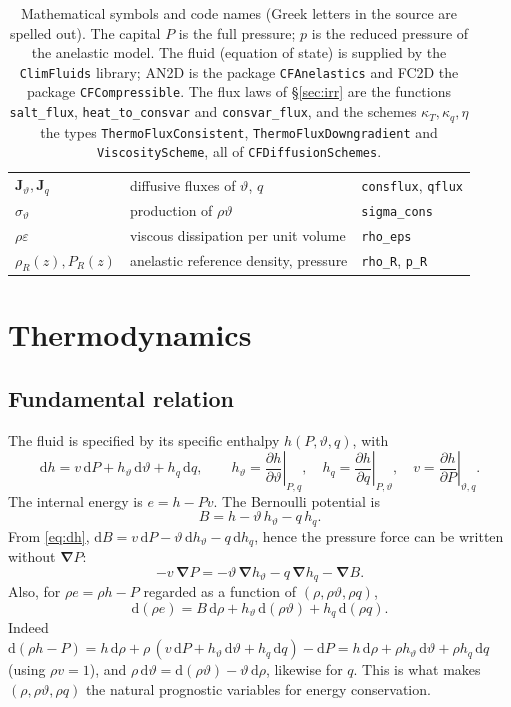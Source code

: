 \documentclass[11pt,a4paper]{article}
\newcommand{\vt}{\vartheta}                    %
\newcommand{\hth}{{h_{\vartheta}}}               %
\newcommand{\hq}{{h_q}}                          %
\newcommand{\bJ}{\mathbf{J}}
\newcommand{\bnabla}{\boldsymbol{\nabla}}
\newcommand{\pdc}[3]{\left.\frac{\partial #1}{\partial #2}\right|_{#3}}
\newcommand{\code}[1]{\texttt{#1}}
\begin{document}
\begin{table}[ht]
\begin{tabular}{p{4.3cm}p{6.0cm}p{4.9cm}}
$\bJ_\vt,\bJ_q$ & diffusive fluxes of $\vt$, $q$ & \code{consflux}, \code{qflux} \\
$\sigma_\vt$ & production of $\rho\vt$ & \code{sigma\_cons} \\
$\rho\varepsilon$ & viscous dissipation per unit volume & \code{rho\_eps} \\
$\rho_R(z),P_R(z)$ & anelastic reference density, pressure & \code{rho\_R}, \code{p\_R} \\
\hline
\end{tabular}
\caption{Mathematical symbols and code names (Greek letters in the source are spelled out). The capital $P$ is the full pressure; $p$ is the reduced pressure of the anelastic model.
The fluid (equation of state) is supplied by the \code{ClimFluids} library; AN2D is the package \code{CFAnelastics} and FC2D the package \code{CFCompressible}. The flux laws of \S\ref{sec:irr} are the functions \code{salt\_flux}, \code{heat\_to\_consvar} and \code{consvar\_flux}, and the schemes $\kappa_T,\kappa_q,\eta$ the types \code{ThermoFluxConsistent}, \code{ThermoFluxDowngradient} and \code{ViscosityScheme}, all of \code{CFDiffusionSchemes}.}
\label{tab:symbols}
\end{table}

\section{Thermodynamics}\label{sec:thermo}
\subsection{Fundamental relation}
The fluid is specified by its specific enthalpy $h(P,\vt,q)$, with
\begin{equation}
  \mathrm{d}h = v\,\mathrm{d}P + \hth\,\mathrm{d}\vt + \hq\,\mathrm{d}q,\qquad
  \hth=\pdc{h}{\vt}{P,q},\quad \hq=\pdc{h}{q}{P,\vt},\quad v=\pdc{h}{P}{\vt,q}.
  \label{eq:dh}
\end{equation}
The internal energy is $e=h-Pv$. The Bernoulli potential is
\begin{equation}
  B = h-\vt\,\hth-q\,\hq .
  \label{eq:B}
\end{equation}
From \eqref{eq:dh}, $\mathrm{d}B = v\,\mathrm{d}P-\vt\,\mathrm{d}\hth-q\,\mathrm{d}\hq$, hence the pressure force can be
written without $\bnabla P$:
\begin{equation}
  -v\,\bnabla P = -\vt\,\bnabla\hth - q\,\bnabla\hq - \bnabla B .
  \label{eq:thermoforce}
\end{equation}
Also, for $\rho e=\rho h-P$ regarded as a function of $(\rho,\rho\vt,\rho q)$,
\begin{equation}
  \mathrm{d}(\rho e) = B\,\mathrm{d}\rho + \hth\,\mathrm{d}(\rho\vt) + \hq\,\mathrm{d}(\rho q).
  \label{eq:dpe}
\end{equation}
Indeed $\mathrm{d}(\rho h-P)=h\,\mathrm{d}\rho+\rho\,(v\,\mathrm{d}P+\hth\,\mathrm{d}\vt+\hq\,\mathrm{d}q)-\mathrm{d}P
=h\,\mathrm{d}\rho+\rho\hth\,\mathrm{d}\vt+\rho\hq\,\mathrm{d}q$ (using $\rho v=1$), and
$\rho\,\mathrm{d}\vt=\mathrm{d}(\rho\vt)-\vt\,\mathrm{d}\rho$, likewise for $q$. This is what makes $(\rho,\rho\vt,\rho q)$ the natural prognostic
variables for energy conservation.
\end{document}
